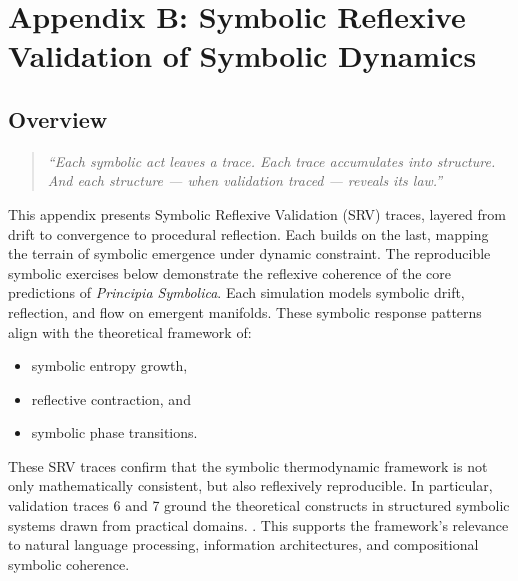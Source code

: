 \clearpage
\chapter*{Appendix B: Symbolic Reflexive Validation of Symbolic Dynamics}
\section*{Overview}
\label{sec:appb_overview}
\begin{quote}
\emph{“Each symbolic act leaves a trace.  
Each trace accumulates into structure.  
And each structure — when validation traced — reveals its law.”}
\end{quote}
\vspace{1em}
This appendix presents Symbolic Reflexive Validation (SRV) traces, layered from drift to convergence to procedural reflection.  
Each builds on the last, mapping the terrain of symbolic emergence under dynamic constraint.
The reproducible symbolic exercises below demonstrate the reflexive coherence  
of the core predictions of \emph{Principia Symbolica}.  
Each simulation models symbolic drift, reflection, and flow on emergent manifolds.
These symbolic response patterns align with the theoretical framework of:
\begin{itemize}
  \item symbolic entropy growth,
  \item reflective contraction, and
  \item symbolic phase transitions.
\end{itemize}
These SRV traces confirm that the symbolic thermodynamic framework  
is not only mathematically consistent, but also reflexively reproducible.
In particular, validation traces 6 and 7 ground the theoretical constructs  
in structured symbolic systems drawn from practical domains.  
\cite{dua2019uci, scikit-learn}.
This supports the framework’s relevance to natural language processing,  
information architectures, and compositional symbolic coherence.
